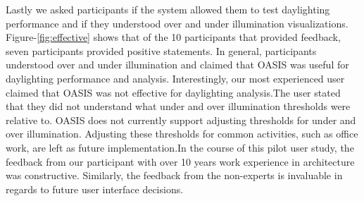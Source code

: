 Lastly we asked participants if the system allowed them to test daylighting performance and if they understood over and under illumination visualizations. Figure-\ref{fig:effective} shows that of the 10 participants that provided feedback, seven participants provided positive statements. In general, participants understood over and under illumination and claimed that OASIS was useful for daylighting performance and analysis. Interestingly, our most experienced user claimed that OASIS was not effective for daylighting analysis.The user stated that they did not understand what under and over illumination thresholds were relative to. OASIS does not currently support adjusting thresholds for under and over illumination. Adjusting these thresholds for common activities, such as office work, are left as future implementation.In the course of this pilot user study, the feedback from our participant with over 10 years work experience in architecture was constructive. Similarly, the feedback from the non-experts is invaluable in regards to future user interface decisions.

